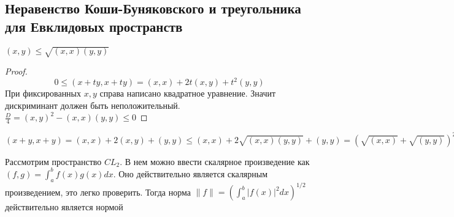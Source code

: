 \documentclass[document.tex]{subfiles}
\begin{document}
\subsection{Неравенство Коши-Буняковского и треугольника для Евклидовых пространств}

\begin{theorem}
    $(x, y) \leq \sqrt{(x, x) (y, y)}$
\end{theorem}

\begin{proof}
    \[
        0 \leq (x + ty, x + ty) = (x, x) + 2t(x, y) + t^2(y, y)
    \]
    При фиксированных $x, y$ справа написано квадратное уравнение. Значит дискриминант должен быть неположительный.
    $\frac{D}{4} = (x, y)^2 - (x, x)(y, y) \leq 0$
\end{proof}

\begin{corollary}
    $(x + y, x + y) = (x, x) + 2(x, y) + (y, y) \leq (x, x) + 2\sqrt{(x, x)(y, y)} + (y, y) = (\sqrt{(x, x)} +
    \sqrt{(y, y)})^2$
\end{corollary}

\begin{example}
    Рассмотрим пространство $CL_{2}$. В нем можно ввести скалярное произведение как $(f, g) = \int_{a}^{b}f(x)g(x)dx$.
    Оно действительно является скалярным произведением, это легко проверить. Тогда норма $\|f\| = \left(
    \int_{a}^{b}|f(x)|^2dx \right)^{1/2}$ действительно является нормой
\end{example}
\end{document}
